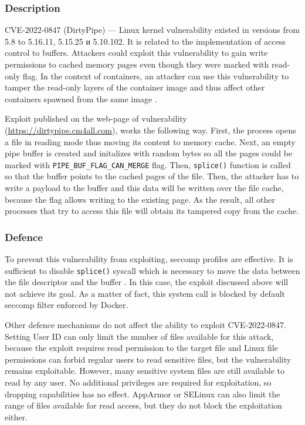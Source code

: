 \subsubsection*{Description}

CVE-2022-0847 (DirtyPipe) — Linux kernel vulnerability existed in versions from 5.8 to 5.16.11, 5.15.25 и 5.10.102. It is related to the implementation of access control to buffers. Attackers could exploit this vulnerability to gain write permissions to cached memory pages even though they were marked with read-only flag. In the context of containers, an attacker can use this vulnerability to tamper the read-only layers of the container image and thus affect other containers spawned from the same image \cite{s:h:2}.

Exploit published on the web-page of vulnerability (\url{https://dirtypipe.cm4all.com}), works the following way. First, the process opens a file in reading mode thus moving its content to memory cache. Next, an empty pipe buffer is created and initalizes with random bytes so all the pages could be marked with \texttt{PIPE\_BUF\_FLAG\_CAN\_MERGE} flag. Then, \texttt{splice()} function is called so that the buffer points to the cached pages of the file. Then, the attacker has to write a payload to the buffer and this data will be written over the file cache, because the flag allows writing to the existing page. As the result, all other processes that try to access this file will obtain its tampered copy from the cache. 

\subsubsection*{Defence}

To prevent this vulnerability from exploiting, seccomp profiles are effective. It is sufficient to disable \texttt{splice()} syscall which is necessary to move the data between the file descriptor and the buffer \cite{s:h:4}. In this case, the exploit discussed above will not achieve its goal. As a matter of fact, this system call is blocked by default seccomp filter enforced by Docker.

Other defence mechanisms do not affect the ability to exploit CVE-2022-0847. Setting User ID can only limit the number of files available for this attack, because the exploit requires read permission to the target file and Linux file permissions can forbid regular users to read sensitive files, but the vulnerability remains exploitable. However, many sensitive system files are still available to read by any user. No additional privileges are required for exploitation, so dropping capabilities has no effect. AppArmor or SELinux can also limit the range of files available for read access, but they do not block the exploitation either.

